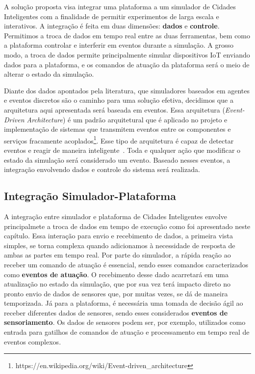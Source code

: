 A solução proposta visa integrar uma plataforma a um simulador de Cidades Inteligentes com a finalidade de permitir experimentos de larga escala e interativos.
A integração é feita em duas dimensões: \textbf{dados} e \textbf{controle}.
Permitimos a troca de dados em tempo real entre as duas ferramentas, bem como a plataforma controlar e interferir em eventos durante a simulação.
A grosso modo, a troca de dados permite principalmente simular dispositivos IoT enviando dados para a plataforma, e os comandos de atuação da plataforma será o meio de alterar o estado da simulação.

Diante dos dados apontados pela literatura, que simuladores baseados em agentes e eventos discretos são o caminho para uma solução efetiva, decidimos que a arquitetura aqui apresentada será baseada em eventos.
Essa arquitetura (\textit{Event-Driven Architecture}) é um padrão arquitetural que é aplicado no projeto e implementação de sistemas que transmitem eventos entre os componentes e
serviços fracamente acoplados\footnote{https://en.wikipedia.org/wiki/Event-driven\_architecture}.
Esse tipo de arquitetura é capaz de detectar eventos e reagir de maneira inteligente~\cite{taylor_2009}.
Toda e qualquer ação que modificar o estado da simulação será considerado um evento.
Baseado nesses eventos, a integração envolvendo dados e controle do sistema será realizada.


\subsection{Integração Simulador-Plataforma}

A integração entre simulador e plataforma de Cidades Inteligentes envolve principalmete a troca de dados em tempo de execução como foi apresentado neste capítulo.
Essa interação para envio e recebimento de dados, a primeira vista simples, se torna complexa quando adicionamos à necessidade de resposta de ambas as partes em tempo real.
Por parte do simulador, a rápida reação ao receber um comando de atuação é essencial, sendo esses comandos caracterizados como \textbf{eventos de atuação}.
O recebimento desse dado acarretará em uma atualização no estado da simulação, que por sua vez terá impacto direto no pronto envio de dados de sensores que, por muitas vezes,
se dá de maneira temporizada.
Já para a plataforma, é necessária uma tomada de decisão ágil ao receber diferentes dados de sensores, sendo esses considerados \textbf{eventos de sensoriamento}.
Os dados de sensores podem ser, por exemplo, utilizados como entrada para gatilhos de comandos de atuação e processamento em tempo real de eventos complexos.

